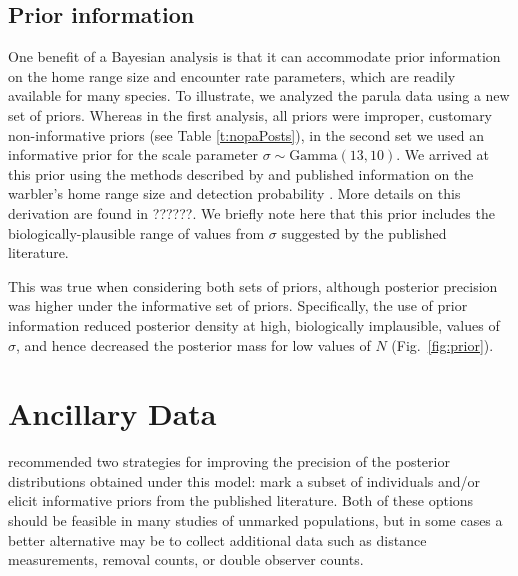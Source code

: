 \subsection{Prior information}



One benefit of a Bayesian analysis is that it can accommodate prior
information on the home range size and encounter rate parameters,
which are readily available for many
species. To illustrate, we analyzed the parula data using a new set of
priors. Whereas in the first analysis, all priors were
improper, customary non-informative priors (see Table \ref{t:nopaPosts}),
in the second set we used
an informative prior for the scale parameter $\sigma \sim
\mbox{Gamma}(13,10)$. We arrived at this prior using the methods
described by \citet{royle_etal:2011mee} and published
information on the warbler's home range size and detection probability
\citep{moldenhaer_regelski:1996,simons_etal:2009}. More details on this
derivation are found in ??????. We briefly note here that this prior
includes the biologically-plausible range of values from $\sigma$
suggested by the published literature.


This was true when considering
both sets of priors, although posterior precision was higher under the
informative set of priors. Specifically, the use of prior information
reduced posterior density at high, biologically implausible,
values of $\sigma$, and hence decreased the posterior mass for
low values of $N$ (Fig.~\ref{fig:prior}).




\section{Ancillary Data}
\label{unmarked.ext}

\citet{chandler_royle:2012} recommended two strategies for improving
the precision of the posterior distributions obtained under this
model: mark a subset of individuals and/or elicit informative
priors from the published literature. Both of these options should be
feasible in many studies of unmarked populations, but in some cases a
better alternative may be to collect
additional data %
such as
distance measurements, %
removal counts, or %
double observer counts.

